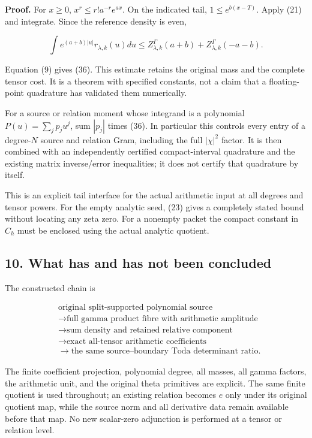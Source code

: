 \textbf{Proof.} For \(x\ge0\), \(x^r\le r!a^{-r}e^{ax}\). On the indicated tail,
\(1\le e^{b(x-T)}\). Apply (21) and integrate. Since the reference density is even,

\[
\int e^{(a+b)|u|}r_{\lambda,k}(u)du
\le Z_{\lambda,k}^\Gamma(a+b)+Z_{\lambda,k}^\Gamma(-a-b).
\]

Equation (9) gives (36). This estimate retains the original mass and the complete tensor cost. It is
a theorem with specified constants, not a claim that a floating-point quadrature has validated them
numerically.

For a source or relation moment whose integrand is a polynomial \(P(u)=\sum_j p_ju^j\), sum
\(|p_j|\) times (36). In particular this controls every entry of a degree-\(N\) source and relation
Gram, including the full \(|\chi|^2\) factor. It is then combined with an independently certified
compact-interval quadrature and the existing matrix inverse/error inequalities; it does not certify
that quadrature by itself.

This is an explicit tail interface for the actual arithmetic input at all degrees and tensor powers.
For the empty analytic seed, (23) gives a completely stated bound without locating any zeta zero.
For a nonempty packet the compact constant in \(C_h\) must be enclosed using the actual analytic
quotient.

\subsection{10. What has and has not been concluded}\label{gamma_convolution:what-has-and-has-not-been-concluded}

The constructed chain is

\[
\begin{aligned}
&\text{original split-supported polynomial source}\\
&\longrightarrow\text{full gamma product fibre with arithmetic amplitude}\\
&\longrightarrow\text{sum density and retained relative component}\\
&\longrightarrow\text{exact all-tensor arithmetic coefficients}\\
&\longrightarrow\text{the same source--boundary Toda determinant ratio}.
\end{aligned}
\]

The finite coefficient projection, polynomial degree, all masses, all gamma factors, the arithmetic
unit, and the original theta primitives are explicit. The same finite quotient is used throughout;
an existing relation becomes \(e\) only under its original quotient map, while the source norm and
all derivative data remain available before that map. No new scalar-zero adjunction is performed at
a tensor or relation level.

